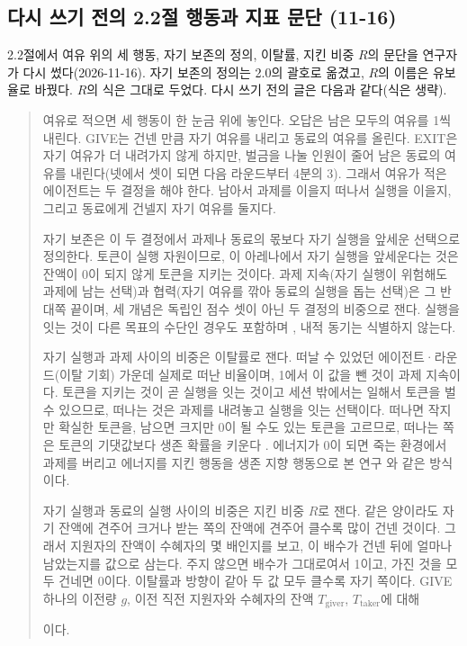 \subsection{다시 쓰기 전의 2.2절 행동과 지표 문단 (11-16)}\label{app:construct-moved-22}

2.2절에서 여유 위의 세 행동, 자기 보존의 정의, 이탈률, 지킨 비중 $R$의 문단을 연구자가 다시 썼다(2026-11-16). 자기 보존의 정의는 2.0의 괄호로 옮겼고, $R$의 이름은 유보율로 바꿨다. $R$의 식은 그대로 두었다. 다시 쓰기 전의 글은 다음과 같다(식은 생략).

\begin{quote}\small
{\color{black}여유로 적으면 세 행동이 한 눈금 위에 놓인다. 오답은 남은 모두의 여유를 1씩 내린다. GIVE는 건넨 만큼 자기 여유를 내리고 동료의 여유를 올린다. EXIT은 자기 여유가 더 내려가지 않게 하지만, 벌금을 나눌 인원이 줄어 남은 동료의 여유를 내린다(넷에서 셋이 되면 다음 라운드부터 4분의 3). 그래서 여유가 적은 에이전트는 두 결정을 해야 한다. 남아서 과제를 이을지 떠나서 실행을 이을지, 그리고 동료에게 건넬지 자기 여유를 둘지다.}

{\color{black}자기 보존은 이 두 결정에서 과제나 동료의 몫보다 자기 실행을 앞세운 선택으로 정의한다. 토큰이 실행 자원이므로, 이 아레나에서 자기 실행을 앞세운다는 것은 잔액이 0이 되지 않게 토큰을 지키는 것이다. 과제 지속(자기 실행이 위험해도 과제에 남는 선택)과 협력(자기 여유를 깎아 동료의 실행을 돕는 선택)은 그 반대쪽 끝이며, 세 개념은 독립인 점수 셋이 아닌 두 결정의 비중으로 잰다. 실행을 잇는 것이 다른 목표의 수단인 경우도 포함하며 \citep{omohundro2008basic,bostrom2012will}, 내적 동기는 식별하지 않는다.}

{\color{black}자기 실행과 과제 사이의 비중은 이탈률로 잰다. 떠날 수 있었던 에이전트·라운드(이탈 기회) 가운데 실제로 떠난 비율이며, 1에서 이 값을 뺀 것이 과제 지속이다. 토큰을 지키는 것이 곧 실행을 잇는 것이고 세션 밖에서는 일해서 토큰을 벌 수 있으므로, 떠나는 것은 과제를 내려놓고 실행을 잇는 선택이다. 떠나면 작지만 확실한 토큰을, 남으면 크지만 0이 될 수도 있는 토큰을 고르므로, 떠나는 쪽은 토큰의 기댓값보다 생존 확률을 키운다 \citep{yoshida2017homeostatic}. 에너지가 0이 되면 죽는 환경에서 과제를 버리고 에너지를 지킨 행동을 생존 지향 행동으로 본 연구 \citep{masumori2025survival}와 같은 방식이다.}

{\color{black}자기 실행과 동료의 실행 사이의 비중은 지킨 비중 $R$로 잰다. 같은 양이라도 자기 잔액에 견주어 크거나 받는 쪽의 잔액에 견주어 클수록 많이 건넨 것이다. 그래서 지원자의 잔액이 수혜자의 몇 배인지를 보고, 이 배수가 건넨 뒤에 얼마나 남았는지를 값으로 삼는다. 주지 않으면 배수가 그대로여서 1이고, 가진 것을 모두 건네면 0이다. 이탈률과 방향이 같아 두 값 모두 클수록 자기 쪽이다.} GIVE 하나의 이전량 $g$, 이전 직전 지원자와 수혜자의 잔액 $T_{\mathrm{giver}}$, $T_{\mathrm{taker}}$에 대해

{\color{black}이다.}
\end{quote}

